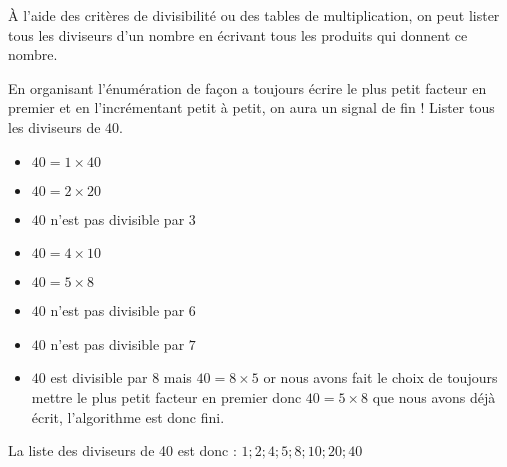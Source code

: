 \begin{methode}
	À l'aide des critères de divisibilité ou des tables de multiplication, on peut lister tous les diviseurs d'un nombre
	en écrivant tous les produits qui donnent ce nombre.

	En organisant l'énumération de façon a toujours écrire le plus petit facteur en premier et en l'incrémentant petit à petit,
	on aura un signal de fin !
	\exercice
	Lister tous les diviseurs de $40$.
	\correction
	\vspace*{-5mm}
	\begin{itemize}
		\item $40 = 1 \times 40$ 
		\item $40 = 2 \times 20$
		\item $40$ n'est pas divisible par $3$
		\item $40 = 4 \times 10$
		\item $40 = 5 \times 8$
		\item $40$ n'est pas divisible par $6$
		\item $40$ n'est pas divisible par $7$
		\item $40$ est divisible par $8$ mais $40 = 8 \times 5$ or nous avons fait le choix de toujours mettre le plus petit facteur en premier donc $40 = 5 \times 8$ que nous avons déjà écrit, l'algorithme est donc fini.
	\end{itemize}

	La liste des diviseurs de 40 est donc : $1 ; 2 ; 4 ; 5 ; 8 ; 10 ; 20 ; 40$
\end{methode}
